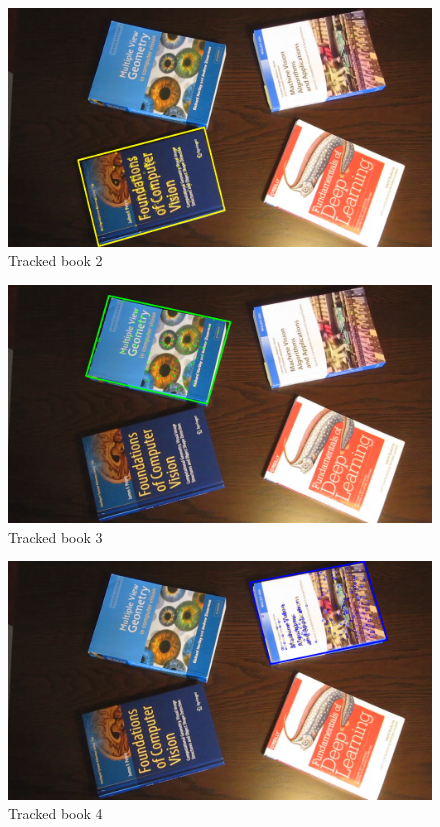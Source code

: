\documentclass[a4paper,11pt]{article}
\begin{document}
\begin{figure}[ht]
    \centering
    \includegraphics[width=\textwidth]{imgs/TrackedFeatures1.png}
    \caption{Tracked book 2}
    \label{fig:book2}
\end{figure}

\begin{figure}[ht]
    \centering
    \includegraphics[width=\textwidth]{imgs/TrackedFeatures2.png}
    \caption{Tracked book 3}
    \label{fig:book3}
\end{figure}

\begin{figure}[ht]
    \centering
    \includegraphics[width=\textwidth]{imgs/TrackedFeatures3.png}
    \caption{Tracked book 4}
    \label{fig:book4}
\end{figure}
\end{document}
